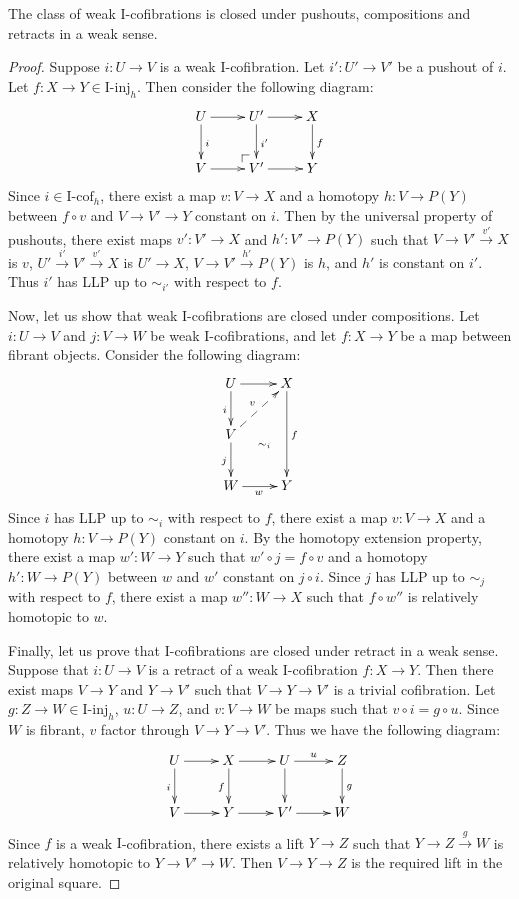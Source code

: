 \documentclass{tac}
\makeatletter
\theoremstyle{definition}
\newcommand{\I}{\mathrm{I}}
\newcommand{\class}[2]{#1\text{-}\mathrm{#2}}
\newcommand{\Iinj}[1][\I]{\class{#1}{inj}}
\newcommand{\Icof}[1][\I]{\class{#1}{cof}}
\newcommand{\po}[1][dr]{\save*!/#1+1.2pc/#1:(1,-1)@^{|-}\restore}
\makeatother
\begin{document}
\begin{prop}
The class of weak $\I$-cofibrations is closed under pushouts, compositions and retracts in a weak sense.
\end{prop}
\begin{proof}
Suppose $i : U \to V$ is a weak $\I$-cofibration.
Let $i' : U' \to V'$ be a pushout of $i$.
Let $f : X \to Y \in \Iinj_h$.
Then consider the following diagram:
\[ \xymatrix{ U \ar[r] \ar[d]^i &     U' \ar[r] \ar[d]^{i'} & X \ar[d]^f \\
              V \ar[r]          & \po V' \ar[r]             & Y
            } \]
Since $i \in \Icof_h$, there exist a map $v : V \to X$ and a homotopy $h : V \to P(Y)$ between $f \circ v$ and $V \to V' \to Y$ constant on $i$.
Then by the universal property of pushouts, there exist maps $v' : V' \to X$ and $h' : V' \to P(Y)$ such that $V \to V' \xrightarrow{v'} X$ is $v$,
$U' \xrightarrow{i'} V' \xrightarrow{v'} X$ is $U' \to X$, $V \to V' \xrightarrow{h'} P(Y)$ is $h$, and $h'$ is constant on $i'$.
Thus $i'$ has LLP up to $\sim_{i'}$ with respect to $f$.

Now, let us show that weak $\I$-cofibrations are closed under compositions.
Let $i : U \to V$ and $j : V \to W$ be weak $\I$-cofibrations, and let $f : X \to Y$ be a map between fibrant objects.
Consider the following diagram:
\[ \xymatrix{ U \ar[r] \ar[d]_i \ar@{}[rdd]|(.6){\sim_i} & X \ar[dd]^f \\
              V \ar[d]_j \ar@{-->}[ur]^v                 &             \\
              W \ar[r]_w                                 & Y
            } \]
Since $i$ has LLP up to $\sim_i$ with respect to $f$, there exist a map $v : V \to X$ and a homotopy $h : V \to P(Y)$ constant on $i$.
By the homotopy extension property, there exist a map $w' : W \to Y$ such that $w' \circ j = f \circ v$ and a homotopy $h' : W \to P(Y)$ between $w$ and $w'$ constant on $j \circ i$.
Since $j$ has LLP up to $\sim_j$ with respect to $f$, there exist a map $w'' : W \to X$ such that $f \circ w''$ is relatively homotopic to $w$.

Finally, let us prove that $\I$-cofibrations are closed under retract in a weak sense.
Suppose that $i : U \to V$ is a retract of a weak $\I$-cofibration $f : X \to Y$.
Then there exist maps $V \to Y$ and $Y \to V'$ such that $V \to Y \to V'$ is a trivial cofibration.
Let $g : Z \to W \in \Iinj_h$, $u : U \to Z$, and $v : V \to W$ be maps such that $v \circ i = g \circ u$.
Since $W$ is fibrant, $v$ factor through $V \to Y \to V'$.
Thus we have the following diagram:
\[ \xymatrix{ U \ar[r] \ar[d]_i & X \ar[r] \ar[d]_f & U \ar[r]^u \ar[d] & Z \ar[d]^g \\
              V \ar[r]          & Y \ar[r]          & V' \ar[r]         & W
            } \]
Since $f$ is a weak $\I$-cofibration, there exists a lift $Y \to Z$ such that $Y \to Z \xrightarrow{g} W$ is relatively homotopic to $Y \to V' \to W$.
Then $V \to Y \to Z$ is the required lift in the original square.
\end{proof}
\end{document}
